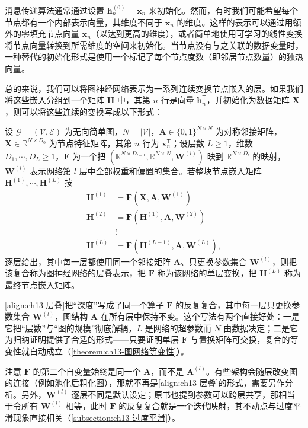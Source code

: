 \documentclass[../../main.tex]{subfiles}
\begin{document}
消息传递算法通常通过设置 $\bm{h}_n^{(0)}=\bm{x}_n$ 来初始化。然而，有时我们可能希望每个节点都有一个内部表示向量，其维度不同于 $\bm{x}_n$ 的维度。这样的表示可以通过用额外的零填充节点向量 $\bm{x}_n$（以达到更高的维度），或者简单地使用可学习的线性变换将节点向量转换到所需维度的空间来初始化。当节点没有与之关联的数据变量时，一种替代的初始化形式是使用一个标记了每个节点度数（即邻居节点数量）的独热向量。

总的来说，我们可以将图神经网络表示为一系列连续变换节点嵌入的层。如果我们将这些嵌入分组到一个矩阵 $\bm{H}$ 中，其第 $n$ 行是向量 $\bm{h}_n^{\mathsf T}$，并初始化为数据矩阵 $\bm{X}$，则可以将这些连续的变换写成以下形式：

\begin{definition}[图网络的层叠表示]\label{definition:ch13-图网络层叠}
设 $\mathcal{G}=(\mathcal{V},\mathcal{E})$ 为无向简单图，$N=|\mathcal{V}|$，$\bm{A}\in\{0,1\}^{N\times N}$ 为对称邻接矩阵，$\bm{X}\in\mathbb{R}^{N\times D_0}$ 为节点特征矩阵，其第 $n$ 行为 $\bm{x}_n^{\mathsf T}$；设层数 $L\geqslant1$，维数 $D_1,\cdots,D_L\geqslant1$，$\bm{F}$ 为一个把 $(\mathbb{R}^{N\times D_{l-1}},\mathbb{R}^{N\times N},\bm{W}^{(l)})$ 映到 $\mathbb{R}^{N\times D_l}$ 的映射，$\bm{W}^{(l)}$ 表示网络第 $l$ 层中全部权重和偏置的集合。若整块节点嵌入矩阵 $\bm{H}^{(1)},\cdots,\bm{H}^{(L)}$ 按
\begin{align}
\bm{H}^{(1)}&=\bm{F}\!\left(\bm{X},\bm{A},\bm{W}^{(1)}\right)\nonumber\\
\bm{H}^{(2)}&=\bm{F}\!\left(\bm{H}^{(1)},\bm{A},\bm{W}^{(2)}\right)\nonumber\\
&\vdots\nonumber\\
\bm{H}^{(L)}&=\bm{F}\!\left(\bm{H}^{(L-1)},\bm{A},\bm{W}^{(L)}\right),
\label{align:ch13-层叠}
\end{align}
逐层给出，其中每一层都使用同一个邻接矩阵 $\bm{A}$、只更换参数集合 $\bm{W}^{(l)}$，则把该复合称为图神经网络的层叠表示，把 $\bm{F}$ 称为该网络的单层变换，把 $\bm{H}^{(L)}$ 称为最终节点嵌入矩阵。
\end{definition}

\begin{remark}
\eqref{align:ch13-层叠}把“深度”写成了同一个算子 $\bm{F}$ 的反复复合，其中每一层只更换参数集合 $\bm{W}^{(l)}$，图结构 $\bm{A}$ 在所有层中保持不变。这个写法有两个直接好处：一是它把“层数”与“图的规模”彻底解耦，$L$ 是网络的超参数而 $N$ 由数据决定；二是它为归纳证明提供了合适的形式——只要证明单层 $\bm{F}$ 与置换矩阵可交换，复合的等变性就自动成立（\cref{theorem:ch13-图网络等变性}）。\par
注意 $\bm{F}$ 的第二个自变量始终是同一个 $\bm{A}$，而不是 $\bm{A}^{(l)}$。有些架构会随层改变图的连接（例如池化后粗化图），那就不再是\eqref{align:ch13-层叠}的形式，需要另作分析。另外，$\bm{W}^{(l)}$ 逐层不同是默认设定；原书也提到参数可以跨层共享，那相当于令所有 $\bm{W}^{(l)}$ 相等，此时 $\bm{F}$ 的反复复合就是一个迭代映射，其不动点与过度平滑现象直接相关（\cref{subsection:ch13-过度平滑}）。
\end{remark}
\end{document}
